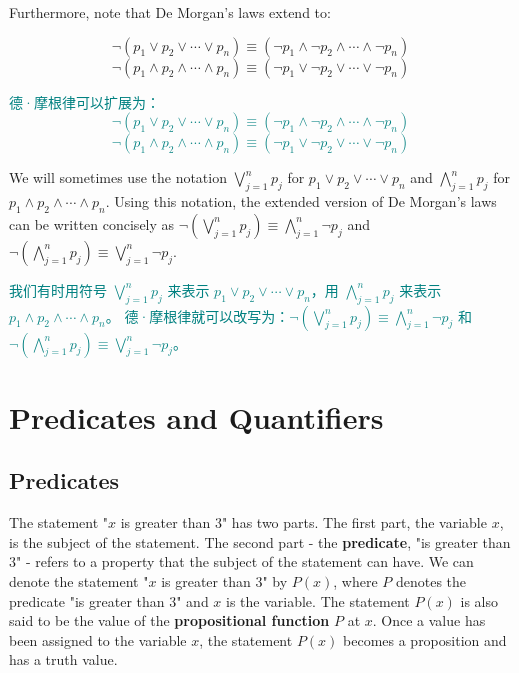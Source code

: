 \documentclass[12pt, a4paper]{article} %
\begin{document}
Furthermore, note that De Morgan's laws extend to:

$$
    \neg (p_1 \vee p_2 \vee \cdots \vee p_n) \equiv (\neg p_1 \wedge \neg p_2 \wedge \cdots \wedge \neg p_n)
$$
$$
    \neg (p_1 \wedge p_2 \wedge \cdots \wedge p_n) \equiv (\neg p_1 \vee \neg p_2 \vee \cdots \vee \neg p_n)
$$

\textcolor{teal}{
    德·摩根律可以扩展为：$$\neg (p_1 \vee p_2 \vee \cdots \vee p_n) \equiv (\neg p_1 \wedge \neg p_2 \wedge \cdots \wedge \neg p_n)$$
    $$\neg (p_1 \wedge p_2 \wedge \cdots \wedge p_n) \equiv (\neg p_1 \vee \neg p_2 \vee \cdots \vee \neg p_n)$$
}

We will sometimes use the notation $\bigvee_{j = 1}^{n} p_j$ for $p_1 \vee p_2 \vee \cdots \vee p_n$ and $\bigwedge_{j = 1}^{n} p_j$ for $p_1 \wedge p_2 \wedge \cdots \wedge p_n$.
Using this notation, the extended version of De Morgan's laws can be written concisely as $\neg (\bigvee_{j = 1}^{n} p_j) \equiv \bigwedge_{j = 1}^{n} \neg p_j$ and $\neg (\bigwedge_{j = 1}^{n} p_j) \equiv \bigvee_{j = 1}^{n} \neg p_j$.

\textcolor{teal}{
    我们有时用符号 $\bigvee_{j = 1}^{n} p_j$ 来表示 $p_1 \vee p_2 \vee \cdots \vee p_n$，用 $\bigwedge_{j = 1}^{n} p_j$ 来表示  $p_1 \wedge p_2 \wedge \cdots \wedge p_n$。
    德·摩根律就可以改写为：$\neg (\bigvee_{j = 1}^{n} p_j) \equiv \bigwedge_{j = 1}^{n} \neg p_j$ 和 $\neg (\bigwedge_{j = 1}^{n} p_j) \equiv \bigvee_{j = 1}^{n} \neg p_j$。
}

\section{Predicates and Quantifiers}
\subsection{Predicates}

The statement "$x$ is greater than $3$" has two parts. The first part, the variable $x$, is the subject of the statement. The second part - the \textbf{predicate}, "is greater than $3$" - refers to a property that the subject of the statement can have.
We can denote the statement "$x$ is greater than $3$" by $P(x)$, where $P$ denotes the predicate "is greater than $3$" and $x$ is the variable. The statement $P(x)$ is also said to be the value of the \textbf{propositional function} $P$ at $x$. Once a value has been assigned to the variable $x$, the statement $P(x)$ becomes a proposition and has a truth value.
\end{document}
